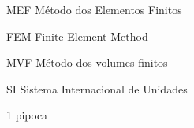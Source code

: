 
\listoffigures*
\cleardoublepage



\listoftables*
\cleardoublepage

\begin{siglas}
	\item[MEF] Método dos Elementos Finitos
	\item[FEM] Finite Element Method 
	\item[MVF] Método dos volumes finitos
	\item[SI]  Sistema Internacional de Unidades
\end{siglas}



\begin{simbolos}
  \item[1] pipoca
\end{simbolos}

